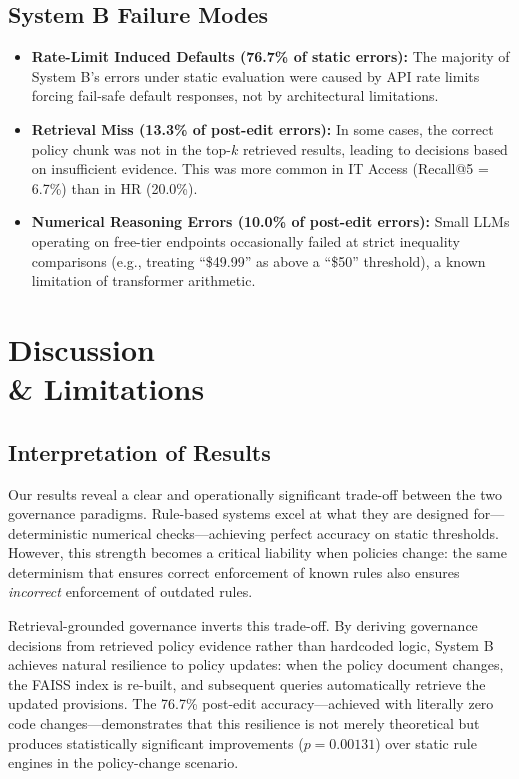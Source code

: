 \documentclass[sigconf,screen]{acmart}
\begin{document}
\subsection{System B Failure Modes}
\begin{itemize}[leftmargin=*]
    \item \textbf{Rate-Limit Induced Defaults (76.7\% of static errors):} The majority of System B's errors under static evaluation were caused by API rate limits forcing fail-safe default responses, not by architectural limitations.
    \item \textbf{Retrieval Miss (13.3\% of post-edit errors):} In some cases, the correct policy chunk was not in the top-$k$ retrieved results, leading to decisions based on insufficient evidence. This was more common in IT Access (Recall@5 = 6.7\%) than in HR (20.0\%).
    \item \textbf{Numerical Reasoning Errors (10.0\% of post-edit errors):} Small LLMs operating on free-tier endpoints occasionally failed at strict inequality comparisons (e.g., treating ``\$49.99'' as above a ``\$50'' threshold), a known limitation of transformer arithmetic.
\end{itemize}

\section{Discussion \\\& Limitations}

\subsection{Interpretation of Results}
Our results reveal a clear and operationally significant trade-off between the two governance paradigms. Rule-based systems excel at what they are designed for---deterministic numerical checks---achieving perfect accuracy on static thresholds. However, this strength becomes a critical liability when policies change: the same determinism that ensures correct enforcement of known rules also ensures \emph{incorrect} enforcement of outdated rules.

Retrieval-grounded governance inverts this trade-off. By deriving governance decisions from retrieved policy evidence rather than hardcoded logic, System B achieves natural resilience to policy updates: when the policy document changes, the FAISS index is re-built, and subsequent queries automatically retrieve the updated provisions. The 76.7\% post-edit accuracy---achieved with literally zero code changes---demonstrates that this resilience is not merely theoretical but produces statistically significant improvements ($p = 0.00131$) over static rule engines in the policy-change scenario.
\end{document}

